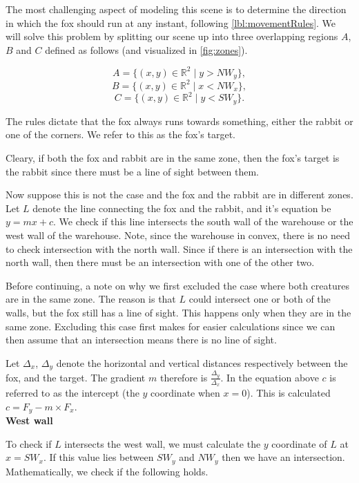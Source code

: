 The most challenging aspect of modeling this scene is to determine the direction in which the fox should run at any instant, following \ref{lbl:movementRules}. We will solve this problem by splitting our scene up into three overlapping regions $A$, $B$ and $C$ defined as follows (and visualized in \ref{fig:zones}). 

$$ A = \{ (x,y) \in \mathbb{R}^2  \mid  y > NW_y \},  $$
$$ B = \{ (x,y) \in \mathbb{R}^2  \mid  x < NW_x \},  $$
$$ C = \{ (x,y) \in \mathbb{R}^2  \mid  y < SW_y \}.  $$



The rules dictate that the fox always runs towards something, either the rabbit or one of the corners. We refer to this as the fox's target.

Cleary, if both the fox and rabbit are in the same zone, then the fox's target is the rabbit since there must be a line of sight between them. 

Now suppose this is not the case and the fox and the rabbit are in different zones. Let $L$ denote the line connecting the fox and the rabbit, and it's equation be $y = mx  + c$. We check if this line intersects the south wall of the warehouse or the west wall of the warehouse. Note, since the warehouse in convex, there is no need to check intersection with the north wall. Since if there is an intersection with the north wall, then there must be an intersection with one of the other two.

Before continuing, a note on why we first excluded the case where both creatures are in the same zone. The reason is that $L$ could intersect one or both of the walls, but the fox still has a line of sight. This happens only when they are in the same zone. Excluding this case first makes for easier calculations since we can then assume that an intersection means there is no line of sight.

Let $\Delta_x$, $\Delta_y$ denote the horizontal and vertical distances respectively between the fox, and the target. The gradient $m$ therefore is $\frac{\Delta_y}{\Delta_x}$. In the equation above $c$ is referred to as the intercept (the $y$ coordinate when $x = 0$). This is calculated $c = F_y - m \times F_x$. \\

\noindent \textbf{West wall}

To check if $L$ intersects the west wall, we must calculate the $y$ coordinate of $L$ at $x = SW_x$. If this value lies between $SW_y$ and $NW_y$ then we have an intersection. Mathematically, we check if the following holds.

